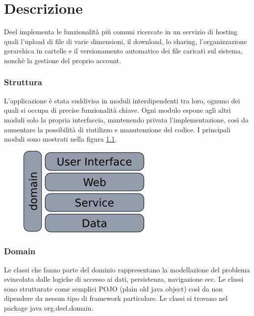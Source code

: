 \chapter{Descrizione}


Deel implementa le funzionalità più comuni ricercate in un servizio di
hosting  quali l'upload di file di varie dimensioni, il
download, lo sharing, l'organizzazione gerarchica in cartelle e il
versionamento automatico dei file caricati sul sistema, nonchè la gestione del
proprio account.

\subsection{Struttura}



L'applicazione è stata suddivisa in moduli interdipendenti tra loro,
ognuno dei quali si occupa di precise funzionalità chiave. Ogni modulo
espone agli altri moduli  solo
la propria interfaccia, mantenendo privata l'implementazione, così da aumentare
la possibilità di riutilizzo e manutenzione del codice. 
I principali moduli sono mostrati nella figura \ref{arc}. 

\begin{figure}
\center
  \includegraphics{architecture}
\caption{}
  \label{arc}
\end{figure}


\subsection{Domain}
Le classi che fanno parte del dominio rappresentano la  modellazione del
problema svincolata dalle logiche di accesso ai dati, persistenza,
navigazione ecc. Le classi sono strutturate come semplici POJO (plain
old java object) così da non dipendere da nessun tipo di framework
particolare. Le classi si trovano nel package java org.deel.domain.

